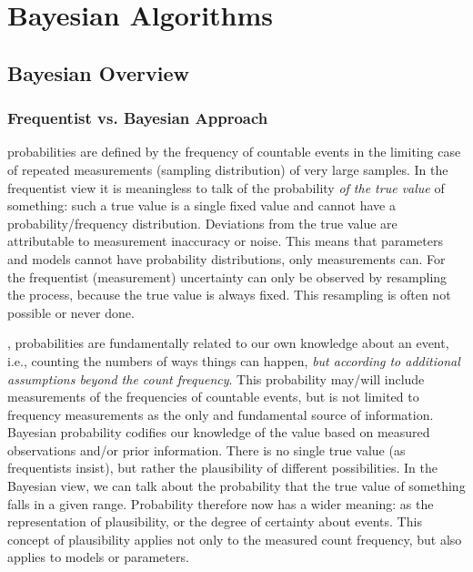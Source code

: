 

\part{Bayesian Algorithms}

\chapter{Bayesian Overview}
\label{chap:BayesianOverview}

\section{Frequentist vs. Bayesian Approach}

 probabilities are defined by the frequency of countable events in the limiting case of repeated measurements (sampling distribution) of very large samples.
In the frequentist view it is meaningless to talk of the probability \textit{of the true value} of something: such a true value is a single fixed value  and cannot have a probability/frequency distribution.  Deviations from the true value are attributable to measurement inaccuracy or noise.
This means that parameters and models cannot have probability distributions, only measurements can. 
For the frequentist (measurement) uncertainty can only be observed by resampling the process, because the true value is always fixed. This resampling is often not possible or never done.\cite{McElreath2015,vanderPlasFreqBayes2014}

, probabilities are fundamentally related to our own knowledge about an event, i.e., counting the numbers of ways things can happen, \textit{but according to additional assumptions beyond the count frequency}. This probability may/will include measurements  of the frequencies of countable events, but is not limited to frequency measurements as the only and fundamental source of information. Bayesian probability codifies our knowledge of the value based on measured observations and/or  prior information.  There is no single true value (as frequentists  insist), but rather the plausibility of different possibilities. In the Bayesian view, we can talk about the probability that the true value of something falls in a given range. Probability therefore now  has a wider meaning: as the representation of  plausibility, or the degree of certainty about events.  This concept of plausibility applies not only to the measured count frequency, but also applies to models or parameters.
 \cite{McElreath2015,vanderPlasFreqBayes2014}

